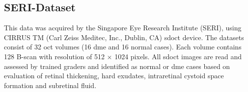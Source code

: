 \subsection{SERI-Dataset}\label{sec:exp:dataset:seri}
This data was acquired by the Singapore Eye Research Institute (SERI), using CIRRUS TM (Carl Zeiss Meditec, Inc., Dublin, CA) \ac{sdoct} device. The datasets consist of 32 \ac{oct} volumes (16 \ac{dme} and 16 normal cases). Each volume contains 128 B-scan with resolution of 512 $\times$ 1024 pixels.
All \ac{sdoct} images are read and assessed by trained graders and identified as normal or \ac{dme} cases based on evaluation of retinal thickening, hard exudates, intraretinal cystoid space formation and subretinal fluid.





%
%
%
%
%
%
%
%

